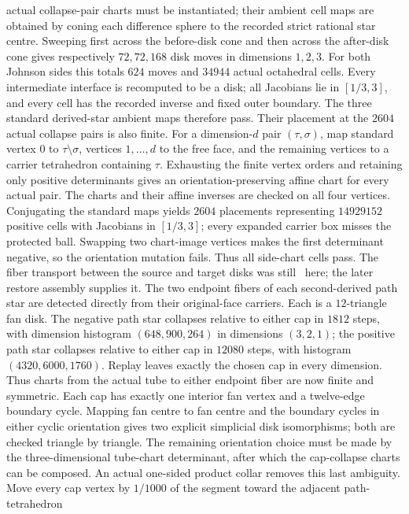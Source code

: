 actual collapse-pair charts must be instantiated; their ambient cell maps
are obtained by coning each difference sphere to the recorded strict rational
star centre.  Sweeping first across the before-disk cone and then across the
after-disk cone gives respectively $72,72,168$ disk moves in dimensions
$1,2,3$.  For both Johnson sides this totals $624$ moves and $34944$ actual
octahedral cells.  Every intermediate interface is recomputed to be a disk;
all Jacobians lie in $[1/3,3]$, and every cell has the recorded inverse and
fixed outer boundary.  The three standard derived-star ambient maps therefore
pass.  Their placement at the $2604$ actual collapse pairs is also finite.
For a dimension-$d$ pair $(\tau,\sigma)$, map standard vertex $0$ to
$\tau\setminus\sigma$, vertices $1,\ldots,d$ to the free face, and the
remaining vertices to a carrier tetrahedron containing $\tau$.  Exhausting the
finite vertex orders and retaining only positive determinants gives an
orientation-preserving affine chart for every actual pair.  The charts and
their affine inverses are checked on all four vertices.  Conjugating the
standard maps yields $2604$ placements representing $14929152$ positive cells
with Jacobians in $[1/3,3]$; every expanded carrier box misses the protected
ball.  Swapping two chart-image vertices makes the first determinant negative,
so the orientation mutation fails.  Thus all side-chart cells pass.  The
fiber transport between the source and target disks was still \Open\ here; the
later restore assembly supplies it.
The two endpoint fibers of each second-derived path star are detected directly
from their original-face carriers.  Each is a $12$-triangle fan disk.  The
negative path star collapses relative to either cap in $1812$ steps, with
dimension histogram $(648,900,264)$ in dimensions $(3,2,1)$; the positive
path star collapses relative to either cap in $12080$ steps, with histogram
$(4320,6000,1760)$.  Replay leaves exactly the chosen cap in every dimension.
Thus charts from the actual tube to either endpoint fiber are now finite and
symmetric.  Each cap has exactly one interior fan vertex and a twelve-edge
boundary cycle.  Mapping fan centre to fan centre and the boundary cycles in
either cyclic orientation gives two explicit simplicial disk isomorphisms;
both are checked triangle by triangle.  The remaining orientation choice must
be made by the three-dimensional tube-chart determinant, after which the
cap-collapse charts can be composed.
An actual one-sided product collar removes this last ambiguity.  Move every
cap vertex by $1/1000$ of the segment toward the adjacent path-tetrahedron
